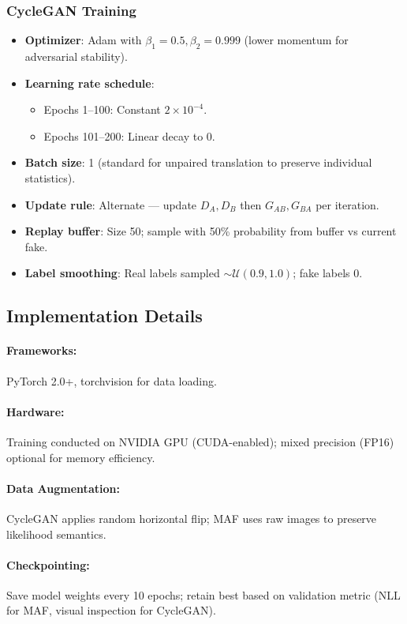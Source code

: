 \documentclass[11pt]{article}
\begin{document}
\subsubsection{CycleGAN Training}
\begin{itemize}
\item \textbf{Optimizer}: Adam with $\beta_1=0.5, \beta_2=0.999$ (lower momentum for adversarial stability).
\item \textbf{Learning rate schedule}: 
  \begin{itemize}
  \item Epochs 1–100: Constant $2 \times 10^{-4}$.
  \item Epochs 101–200: Linear decay to 0.
  \end{itemize}
\item \textbf{Batch size}: 1 (standard for unpaired translation to preserve individual statistics).
\item \textbf{Update rule}: Alternate — update $D_A, D_B$ then $G_{AB}, G_{BA}$ per iteration.
\item \textbf{Replay buffer}: Size 50; sample with 50\% probability from buffer vs current fake.
\item \textbf{Label smoothing}: Real labels sampled $\sim \mathcal{U}(0.9, 1.0)$; fake labels 0.
\end{itemize}

\subsection{Implementation Details}
\paragraph{Frameworks:} PyTorch 2.0+, torchvision for data loading.
\paragraph{Hardware:} Training conducted on NVIDIA GPU (CUDA-enabled); mixed precision (FP16) optional for memory efficiency.
\paragraph{Data Augmentation:} CycleGAN applies random horizontal flip; MAF uses raw images to preserve likelihood semantics.
\paragraph{Checkpointing:} Save model weights every 10 epochs; retain best based on validation metric (NLL for MAF, visual inspection for CycleGAN).
\end{document}
